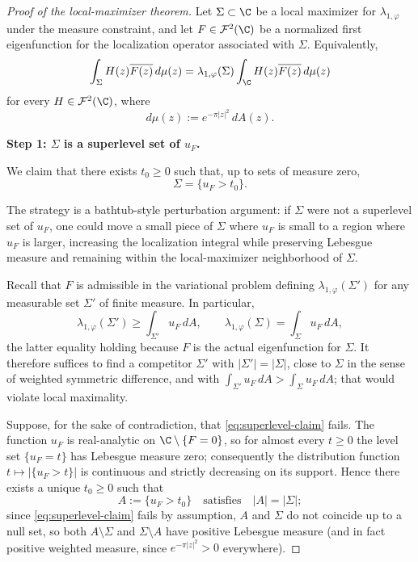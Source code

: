 \begin{proof}[Proof of the local-maximizer theorem]
Let \(\Sigma\subset \C\) be a local maximizer for \(\lambda_{1,\varphi}\) under
the measure constraint, and let \(F\in \mathcal F^2(\C)\) be a normalized first
eigenfunction for the localization operator associated with \(\Sigma\).
Equivalently,
\begin{equation}\label{eq:eigenvalue-equation}
\int_\Sigma H(z)\overline{F(z)}\,d\mu(z)
=
\lambda_{1,\varphi}(\Sigma)\int_\C H(z)\overline{F(z)}\,d\mu(z)
\end{equation}
for every \(H\in \mathcal F^2(\C)\), where
\[
d\mu(z):=e^{-\pi |z|^2}\,dA(z).
\]

\medskip
\noindent
{\bf Step 1: \(\Sigma\) is a superlevel set of \(u_F\).}

We claim that there exists \(t_0\ge 0\) such that, up to sets of measure zero,
\begin{equation}\label{eq:superlevel-claim}
\Sigma=\{u_F>t_0\}.
\end{equation}

The strategy is a bathtub-style perturbation argument: if \(\Sigma\) were not a
superlevel set of \(u_F\), one could move a small piece of \(\Sigma\) where
\(u_F\) is small to a region where \(u_F\) is larger, increasing the
localization integral while preserving Lebesgue measure and remaining within
the local-maximizer neighborhood of \(\Sigma\).

Recall that \(F\) is admissible in the variational problem defining
\(\lambda_{1,\varphi}(\Sigma')\) for any measurable set \(\Sigma'\) of finite
measure. In particular,
\[
\lambda_{1,\varphi}(\Sigma')\ge \int_{\Sigma'} u_F\,dA,
\qquad
\lambda_{1,\varphi}(\Sigma)= \int_\Sigma u_F\,dA,
\]
the latter equality holding because \(F\) is the actual eigenfunction for
\(\Sigma\). It therefore suffices to find a competitor \(\Sigma'\) with
\(|\Sigma'|=|\Sigma|\), close to \(\Sigma\) in the sense of weighted symmetric
difference, and with \(\int_{\Sigma'} u_F\,dA>\int_\Sigma u_F\,dA\); that would
violate local maximality.

Suppose, for the sake of contradiction, that \eqref{eq:superlevel-claim} fails.
The function \(u_F\) is real-analytic on \(\C\setminus\{F=0\}\), so for almost
every \(t\ge 0\) the level set \(\{u_F=t\}\) has Lebesgue measure zero;
consequently the distribution function \(t\mapsto |\{u_F>t\}|\) is continuous
and strictly decreasing on its support. Hence there exists a unique
\(t_0\ge 0\) such that
\[
A:=\{u_F>t_0\}\quad\text{satisfies}\quad |A|=|\Sigma|;
\]
since \eqref{eq:superlevel-claim} fails by assumption, \(A\) and \(\Sigma\)
do not coincide up to a null set, so both \(A\setminus\Sigma\) and
\(\Sigma\setminus A\) have positive Lebesgue measure (and in fact positive
weighted measure, since \(e^{-\pi|z|^2}>0\) everywhere).


\end{proof}
